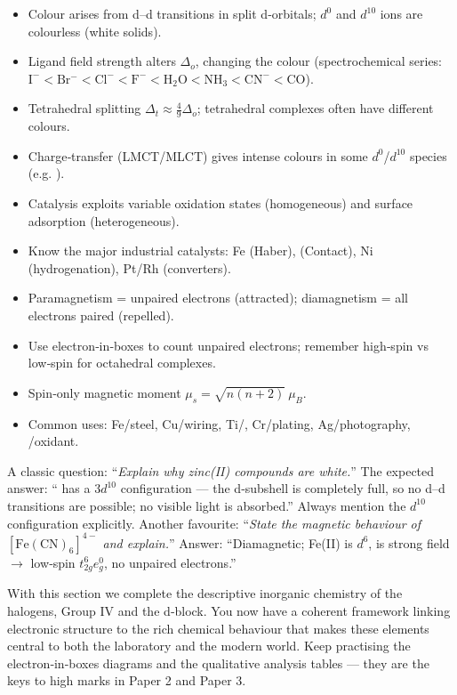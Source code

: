 \documentclass[11pt]{article}
\begin{document}
\begin{aretenir}
\begin{itemize}
\item Colour arises from d–d transitions in split d‑orbitals; $d^0$ and $d^{10}$ ions are colourless (white solids).
\item Ligand field strength alters $\Delta_o$, changing the colour (spectrochemical series: \ensuremath{\mathrm{I^{-} < Br^{-} < Cl^{-} < F^{-} < H_{2}O < NH_{3} < CN^{-} < CO}}).
\item Tetrahedral splitting $\Delta_t \approx \frac{4}{9}\Delta_o$; tetrahedral complexes often have different colours.
\item Charge‑transfer (LMCT/MLCT) gives intense colours in some $d^0$/$d^{10}$ species (e.g. ).
\item Catalysis exploits variable oxidation states (homogeneous) and surface adsorption (heterogeneous).
\item Know the major industrial catalysts: Fe (Haber),  (Contact), Ni (hydrogenation), Pt/Rh (converters).
\item Paramagnetism = unpaired electrons (attracted); diamagnetism = all electrons paired (repelled).
\item Use electron‑in‑boxes to count unpaired electrons; remember high‑spin vs low‑spin for octahedral complexes.
\item Spin‑only magnetic moment $\mu_s = \sqrt{n(n+2)}\ \mu_B$.
\item Common uses: Fe/steel, Cu/wiring, Ti/, Cr/plating, Ag/photography, /oxidant.
\end{itemize}
\end{aretenir}

\begin{aretenir}
A classic question: “\emph{Explain why zinc(II) compounds are white.}” The expected answer: “ has a $3d^{10}$ configuration — the d‑subshell is completely full, so no d–d transitions are possible; no visible light is absorbed.” Always mention the $d^{10}$ configuration explicitly. Another favourite: “\emph{State the magnetic behaviour of \ensuremath{\mathrm{[Fe(CN)_{6}]^{4-}}} and explain.}” Answer: “Diamagnetic; Fe(II) is $d^6$,  is strong field $\rightarrow$ low‑spin $t_{2g}^6 e_g^0$, no unpaired electrons.”
\end{aretenir}

With this section we complete the descriptive inorganic chemistry of the halogens, Group IV and the d‑block. You now have a coherent framework linking electronic structure to the rich chemical behaviour that makes these elements central to both the laboratory and the modern world. Keep practising the electron‑in‑boxes diagrams and the qualitative analysis tables — they are the keys to high marks in Paper 2 and Paper 3.
\end{document}
